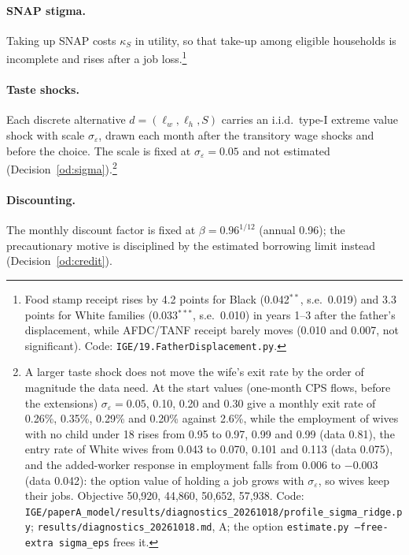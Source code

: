\documentclass[11pt]{article}
\newcommand{\code}[1]{\texttt{#1}}
\newcommand{\1}{\mathbf{1}}
\begin{document}
\paragraph{SNAP stigma.} Taking up SNAP costs $\kappa_S$ in utility, so that take-up among eligible households is
incomplete and rises after a job loss.\footnote{Food stamp receipt rises by 4.2 points for Black (0.042$^{**}$, s.e.\
0.019) and 3.3 points for White families (0.033$^{***}$, s.e.\ 0.010) in years 1--3 after the father's displacement,
while AFDC/TANF receipt barely moves (0.010 and 0.007, not significant). Code: \code{IGE/19.FatherDisplacement.py}.}

\paragraph{Taste shocks.} Each discrete alternative $d = (\ell_w, \ell_h, S)$ carries an i.i.d.\ type-I extreme value
shock with scale $\sigma_\varepsilon$, drawn each month after the transitory wage shocks and before the choice. The
scale is fixed at $\sigma_\varepsilon = 0.05$ and not estimated (Decision~\ref{od:sigma}).\footnote{A larger taste shock
does not move the wife's exit rate by the order of magnitude the data need. At the start values (one-month CPS flows,
before the extensions) $\sigma_\varepsilon = 0.05$, 0.10, 0.20 and 0.30 give a monthly exit rate of 0.26\%, 0.35\%,
0.29\% and 0.20\% against 2.6\%, while the employment of wives with no child under 18 rises from 0.95 to 0.97, 0.99 and
0.99 (data 0.81), the entry rate of White wives from 0.043 to 0.070, 0.101 and 0.113 (data 0.075), and the added-worker
response in employment falls from 0.006 to $-0.003$ (data 0.042): the option value of holding a job grows with
$\sigma_\varepsilon$, so wives keep their jobs. Objective 50{,}920, 44{,}860, 50{,}652, 57{,}938. Code:
\code{IGE/paperA\_model/results/diagnostics\_20261018/profile\_sigma\_ridge.py}; \code{results/diagnostics\_20261018.md},
A; the option \code{estimate.py --free-extra sigma\_eps} frees it.}

\paragraph{Discounting.} The monthly discount factor is fixed at $\beta = 0.96^{1/12}$ (annual 0.96); the
precautionary motive is disciplined by the estimated borrowing limit instead (Decision~\ref{od:credit}).

\end{document}

